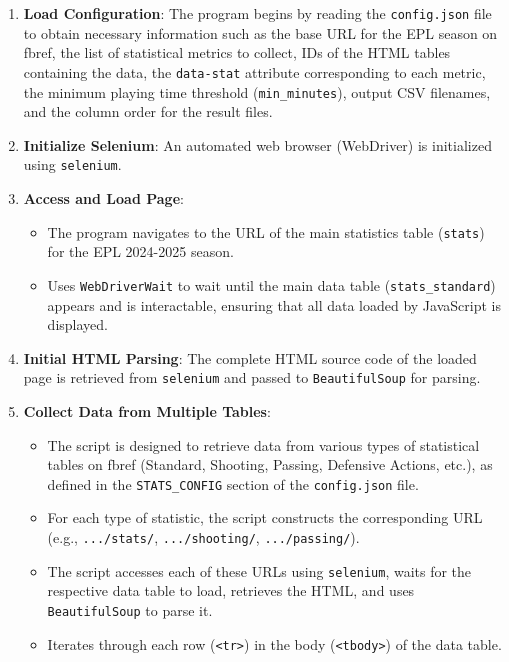\documentclass[12pt, a4paper]{report}
\begin{document}
\begin{enumerate}[label=\textbf{Step \arabic*:}, leftmargin=*]
    \item \textbf{Load Configuration}: The program begins by reading the \texttt{config.json} file to obtain necessary information such as the base URL for the EPL season on fbref, the list of statistical metrics to collect, IDs of the HTML tables containing the data, the \texttt{data-stat} attribute corresponding to each metric, the minimum playing time threshold (\texttt{min\_minutes}), output CSV filenames, and the column order for the result files.
    \item \textbf{Initialize Selenium}: An automated web browser (WebDriver) is initialized using \texttt{selenium}.
    \item \textbf{Access and Load Page}:
    \begin{itemize}[leftmargin=0em]
        \item The program navigates to the URL of the main statistics table (\texttt{stats}) for the EPL 2024-2025 season.
        \item Uses \texttt{WebDriverWait} to wait until the main data table (\texttt{stats\_standard}) appears and is interactable, ensuring that all data loaded by JavaScript is displayed.
    \end{itemize}
    \item \textbf{Initial HTML Parsing}: The complete HTML source code of the loaded page is retrieved from \texttt{selenium} and passed to \texttt{BeautifulSoup} for parsing.
    \item \textbf{Collect Data from Multiple Tables}:
    \begin{itemize}[leftmargin=0em]
        \item The script is designed to retrieve data from various types of statistical tables on fbref (Standard, Shooting, Passing, Defensive Actions, etc.), as defined in the \texttt{STATS\_CONFIG} section of the \texttt{config.json} file.
        \item For each type of statistic, the script constructs the corresponding URL (e.g., \texttt{.../stats/}, \texttt{.../shooting/}, \texttt{.../passing/}).
        \item The script accesses each of these URLs using \texttt{selenium}, waits for the respective data table to load, retrieves the HTML, and uses \texttt{BeautifulSoup} to parse it.
        \item Iterates through each row (\texttt{<tr>}) in the body (\texttt{<tbody>}) of the data table.

\end{itemize}
\end{enumerate}
\end{document}
